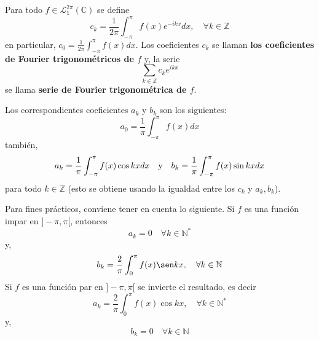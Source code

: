 \documentclass[12pt]{report}
\theoremstyle{largebreak}
\begin{document}
    \begin{mydef}
        Para todo $f\in\mathcal{L}_1^{2\pi}(\mathbb{C})$ se define
        \begin{equation}
            c_k=\frac{1}{2\pi}\int_{ -\pi}^\pi f(x)e^{ -ikx}dx,\quad\forall k\in\mathbb{Z}
            \label{eq:coef_fourier_3}
        \end{equation}
        en particular, $c_0=\frac{1}{2\pi}\int_{ -\pi}^{\pi}f(x)dx$. Los coeficientes $c_k$ se llaman \textbf{los coeficientes de Fourier trigonométricos de $f$} y, la serie
        \begin{equation*}
            \sum_{ k\in\mathbb{Z}}c_k e^{ ikx}
        \end{equation*}
        se llama \textbf{serie de Fourier trigonométrica de $f$}.
    \end{mydef}

    \begin{obs}
        Los correspondientes coeficientes $a_k$ y $b_k$ son los siguientes:
        \begin{equation*}
            a_0=\frac{1}{\pi}\int_{-\pi}^\pi f(x)dx
            \label{eq:coef_fourier_4}
        \end{equation*}
        también,
        \begin{equation*}
            a_k=\frac{1}{\pi}\int_{-\pi}^\pi f(x)\cos kxdx\quad\textup{y}\quad b_k=\frac{1}{\pi}\int_{-\pi}^\pi f(x)\sin kxdx
        \end{equation*}
        para todo $k\in\mathbb{Z}$ (esto se obtiene usando la igualdad entre los $c_k$ y $a_k,b_k$).
    \end{obs}

    \begin{obs}
        Para fines prácticos, conviene tener en cuenta lo siguiente.
        Si $f$ es una función impar en $]-\pi,\pi[$, entonces
        \begin{equation*}
            a_k=0\quad\forall k\in\mathbb{N}^*
        \end{equation*}
        y,
        \begin{equation*}
            b_k=\frac{2}{\pi}\int_{0}^{\pi}f(x)\sen kx,\quad\forall k\in\mathbb{N}
        \end{equation*}
        Si $f$ es una función par en $]-\pi,\pi[$ se invierte el resultado, es decir
        \begin{equation*}
            a_k=\frac{2}{\pi}\int_{0}^{\pi}f(x)\cos kx,\quad\forall k\in\mathbb{N}^*
        \end{equation*}
        y,
        \begin{equation*}
            b_k=0\quad\forall k\in\mathbb{N}
        \end{equation*}
    \end{obs}
\end{document}
